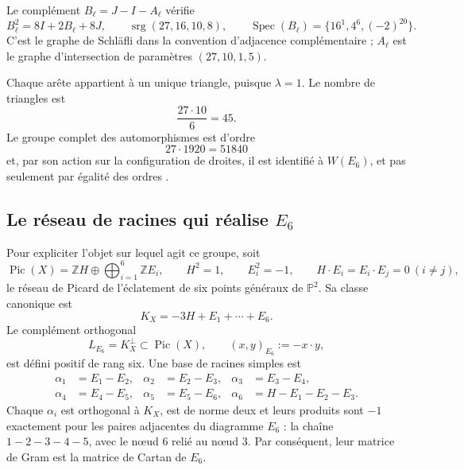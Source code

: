 Le complément \(B_\ell=J-I-A_\ell\) vérifie
\begin{equation}
 B_\ell^2=8I+2B_\ell+8J,
 \qquad
 \operatorname{srg}(27,16,10,8),
 \qquad
 \operatorname{Spec}(B_\ell)=\{16^1,4^6,(-2)^{20}\}.
 \label{x_reciprocidad:p12-83-c20-s6:eq:complemento-schlafli}
\end{equation}
C'est le graphe de Schläfli dans la convention d'adjacence complémentaire ; \(A_\ell\) est le graphe d'intersection de paramètres \((27,10,1,5)\).

Chaque arête appartient à un unique triangle, puisque \(\lambda=1\). Le nombre
de triangles est
\[
 \frac{27\cdot10}{6}=45.
\]
Le groupe complet des automorphismes est d’ordre
\[
 27\cdot1920=51840
\]
et, par son action sur la configuration de droites, il est identifié à \(W(E_6)\), et pas seulement par égalité des ordres \cite{x_reciprocidad:Manivel2005}.

\subsection{Le réseau de racines qui réalise \texorpdfstring{\(E_6\)}{E6}}

Pour expliciter l’objet sur lequel agit ce groupe, soit
\begin{equation}
 \operatorname{Pic}(X)
 =\mathbb ZH\oplus\bigoplus_{i=1}^6\mathbb ZE_i,
 \qquad
 H^2=1,\qquad E_i^2=-1,\qquad H\cdot E_i=E_i\cdot E_j=0\ (i\ne j),
 \label{x_reciprocidad:p12-83-c20-s6:eq:picard-cubica-e6}
\end{equation}
le réseau de Picard de l’éclatement de six points généraux de
\(\mathbb P^2\). Sa classe canonique est
\[
 K_X=-3H+E_1+\cdots+E_6.
\]
Le complément orthogonal
\begin{equation}
 L_{E_6}=K_X^\perp\subset\operatorname{Pic}(X),
 \qquad (x,y)_{E_6}:=-x\cdot y,
 \label{x_reciprocidad:p12-83-c20-s6:eq:reticulo-raices-e6}
\end{equation}
est défini positif de rang six. Une base de racines simples est
\begin{equation}
 \begin{aligned}
 \alpha_1&=E_1-E_2,& \alpha_2&=E_2-E_3,&
 \alpha_3&=E_3-E_4,\\
 \alpha_4&=E_4-E_5,& \alpha_5&=E_5-E_6,&
 \alpha_6&=H-E_1-E_2-E_3.
 \end{aligned}
 \label{x_reciprocidad:p12-83-c20-s6:eq:raices-simples-e6}
\end{equation}
Chaque \(\alpha_i\) est orthogonal à \(K_X\), est de norme deux et leurs produits
sont \(-1\) exactement pour les paires adjacentes du diagramme
\(E_6\) : la chaîne \(1-2-3-4-5\), avec le nœud \(6\) relié au nœud \(3\).
Par conséquent, leur matrice de Gram est la matrice de Cartan de \(E_6\).

